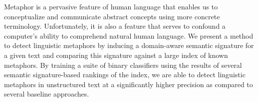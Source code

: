 Metaphor is a pervasive feature of human language that enables us to conceptualize and communicate abstract concepts using more concrete
 terminology. Unfortunately, it is also a feature that serves to confound a
 computer's ability to comprehend natural human language. We present a method
 to detect linguistic metaphors by inducing a domain-aware semantic signature
 for a given text and comparing this signature against a large index of known
 metaphors. By training a suite of binary classifiers using the results of
 several semantic signature-based rankings of the index, we are able to detect
 linguistic metaphors in unstructured text at a significantly higher precision
 as compared to several baseline approaches.

